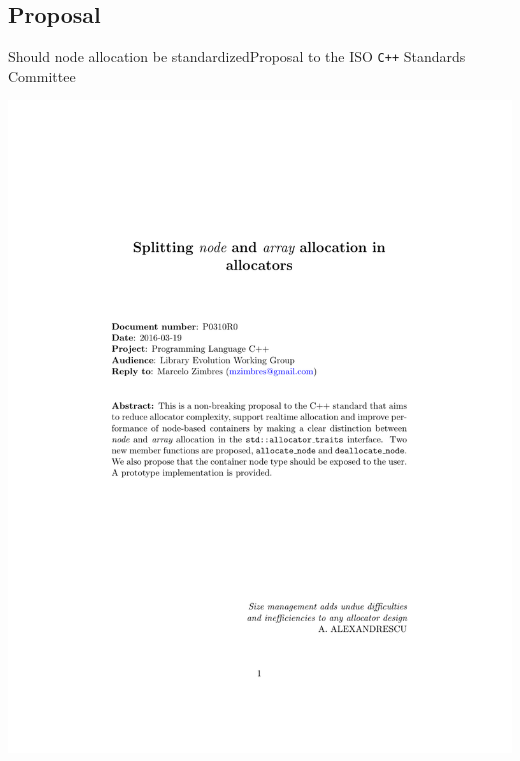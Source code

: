\documentclass[10pt,aspectratio=169]{beamer}
\begin{document}
\subsection{Proposal}

\begin{frame}{Should node allocation be standardized}{Proposal to the ISO \texttt{C++} Standards Committee}
\vspace{-3cm}
    \begin{center}
        \includegraphics[scale=0.6]{fig/prop1.pdf} \\
    \end{center}
\end{frame}
\end{document}
